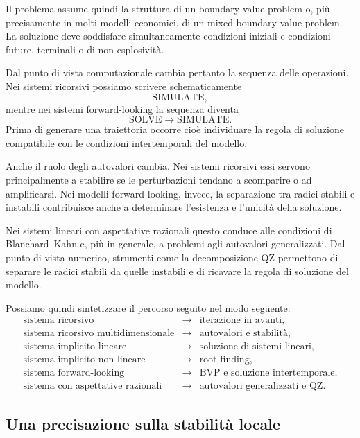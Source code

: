 \documentclass{book}
\begin{document}
Il problema assume quindi la struttura di un boundary value problem o,
più precisamente in molti modelli economici, di un mixed boundary value
problem. La soluzione deve soddisfare simultaneamente condizioni
iniziali e condizioni future, terminali o di non esplosività.

Dal punto di vista computazionale cambia pertanto la sequenza delle
operazioni. Nei sistemi ricorsivi possiamo scrivere schematicamente
\[
\text{SIMULATE},
\]
mentre nei sistemi forward-looking la sequenza diventa
\[
\text{SOLVE}
\rightarrow
\text{SIMULATE}.
\]
Prima di generare una traiettoria occorre cioè individuare la regola di
soluzione compatibile con le condizioni intertemporali del modello.

Anche il ruolo degli autovalori cambia. Nei sistemi ricorsivi essi
servono principalmente a stabilire se le perturbazioni tendano a
scomparire o ad amplificarsi. Nei modelli forward-looking, invece, la
separazione tra radici stabili e instabili contribuisce anche a
determinare l'esistenza e l'unicità della soluzione.

Nei sistemi lineari con aspettative razionali questo conduce alle
condizioni di Blanchard--Kahn e, più in generale, a problemi agli
autovalori generalizzati. Dal punto di vista numerico, strumenti come
la decomposizione QZ permettono di separare le radici stabili da quelle
instabili e di ricavare la regola di soluzione del modello.

Possiamo quindi sintetizzare il percorso seguito nel modo seguente:
\[
\begin{array}{ccl}
\text{sistema ricorsivo} & \longrightarrow &
\text{iterazione in avanti},\\
\text{sistema ricorsivo multidimensionale} & \longrightarrow &
\text{autovalori e stabilità},\\
\text{sistema implicito lineare} & \longrightarrow &
\text{soluzione di sistemi lineari},\\
\text{sistema implicito non lineare} & \longrightarrow &
\text{root finding},\\
\text{sistema forward-looking} & \longrightarrow &
\text{BVP e soluzione intertemporale},\\
\text{sistema con aspettative razionali} & \longrightarrow &
\text{autovalori generalizzati e QZ}.
\end{array}
\]

\subsection{Una precisazione sulla stabilità locale}
\end{document}
